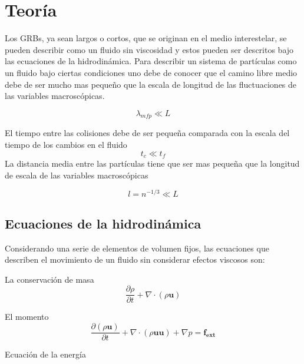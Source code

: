\documentclass[12pt,a4paper]{book}
\begin{document}
\chapter{Teoría}

Los GRBs, ya sean largos o cortos, que se originan en el medio interestelar, se pueden describir como un fluido sin viscosidad y estos pueden ser descritos bajo
las ecuaciones de la hidrodinámica.
Para describir un sistema de partículas como un fluido bajo ciertas condiciones uno debe de conocer que el camino libre medio debe de ser mucho mas pequeño que la escala de longitud de las fluctuaciones de las variables macroscópicas.

\begin{equation}
\lambda_{mfp} \ll L
\end{equation}

El tiempo entre las colisiones debe de ser pequeña comparada con la escala del tiempo de los cambios en el fluido
\begin{equation}
t_{c} \ll t_f
\end{equation}
La distancia media entre las partículas tiene que ser mas pequeña que la longitud de escala de las variables macroscópicas

\begin{equation}
l = n^{-1/3} \ll L
\end{equation}



\section{Ecuaciones de la hidrodinámica}


Considerando una serie de elementos de volumen fijos, las ecuaciones que describen el movimiento de un fluido sin considerar efectos viscosos son:

La conservación de masa
\begin{equation} \label{conservación_masa_hidrodinamica}
\dfrac{\partial \rho }{\partial t} + \nabla \cdot \left( \rho \mathbf{u} \right)
\end{equation}

El momento
\begin{equation}  \label{conservacion_momento_hidrodinamica}
\dfrac{\partial \left( \rho \mathbf{u} \right) }{\partial t}+ \nabla \cdot \left( \rho \mathbf{u u} \right) + \nabla p = \mathbf{f_{ext}}
\end{equation}

Ecuación de la energía
\end{document}
